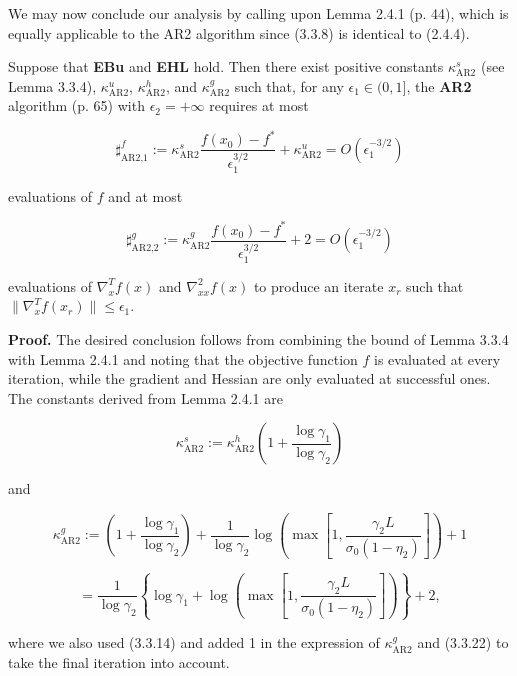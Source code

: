 \documentclass[10pt,a4paper]{article}
\begin{document}
We may now conclude our analysis by calling upon Lemma 2.4.1 (p. 44), which is equally applicable to the AR2 algorithm since (3.3.8) is identical to (2.4.4).


\begin{theorem}

Suppose that \textbf{EBu} and \textbf{EHL} hold. Then there exist positive constants $\kappa_{\text{AR2}}^s$ (see Lemma 3.3.4), $\kappa_{\text{AR2}}^u$, $\kappa_{\text{AR2}}^h$, and $\kappa_{\text{AR2}}^g$ such that, for any $\epsilon_1 \in (0, 1]$, the \textbf{AR2} algorithm (p. 65) with $\epsilon_2 = +\infty$ requires at most

\begin{equation*}
\sharp_{\text{AR2,1}}^f := \kappa_{\text{AR2}}^s \frac{f(x_0) - f^*}{\epsilon_1^{3/2}} + \kappa_{\text{AR2}}^u = O\left(\epsilon_1^{-3/2}\right)
\end{equation*}

evaluations of $f$ and at most

\begin{equation*}
\sharp_{\text{AR2,2}}^g := \kappa_{\text{AR2}}^g \frac{f(x_0) - f^*}{\epsilon_1^{3/2}} + 2 = O\left(\epsilon_1^{-3/2}\right)
\end{equation*}

evaluations of $\nabla_x^T f(x)$ and $\nabla_{xx}^2 f(x)$ to produce an iterate $x_r$ such that $\|\nabla_x^T f(x_r)\| \leq \epsilon_1$.
\end{theorem}

\textbf{Proof.} The desired conclusion follows from combining the bound of Lemma 3.3.4 with Lemma 2.4.1 and noting that the objective function $f$ is evaluated at every iteration, while the gradient and Hessian are only evaluated at successful ones. The constants derived from Lemma 2.4.1 are

\begin{equation*}
	\kappa_{\text{AR2}}^s := \kappa_{\text{AR2}}^h \left(1 + \frac{\log \gamma_1}{\log \gamma_2}\right)
\end{equation*}

and

\begin{equation*}
	\kappa_{\text{AR2}}^g := \left(1 + \frac{\log \gamma_1}{\log \gamma_2}\right) + \frac{1}{\log \gamma_2} \log \left(\max \left[1, \frac{\gamma_2 L}{\sigma_0(1-\eta_2)}\right]\right) + 1
\end{equation*}

\begin{equation*}
	= \frac{1}{\log \gamma_2} \left\{\log \gamma_1 + \log \left(\max \left[1, \frac{\gamma_2 L}{\sigma_0(1-\eta_2)}\right]\right)\right\} + 2,
\end{equation*}

where we also used (3.3.14) and added 1 in the expression of $\kappa_{\text{AR2}}^g$ and (3.3.22) to take the final iteration into account.



\end{document}
